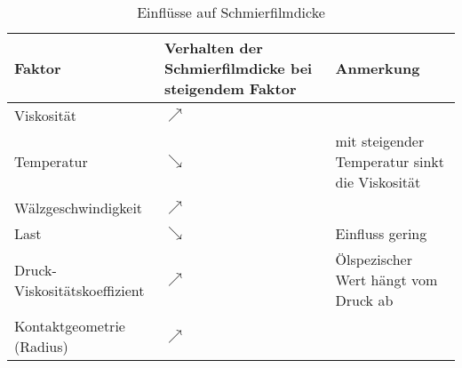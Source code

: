 \begin{table}[htbp]
    \caption{Einflüsse auf Schmierfilmdicke \cite{wisniewski_2000}}
    \begin{tabular}{l>{\centering\arraybackslash}m{5cm}>{\centering\arraybackslash}m{6cm}}
        \textbf{Faktor}              & \textbf{Verhalten der Schmierfilmdicke bei steigendem Faktor} & \textbf{Anmerkung}                             \\ \hline
        Viskosität                   & $\nearrow$                                                    &                                                \\
        Temperatur                   & $\searrow$                                                    & mit steigender Temperatur sinkt die Viskosität \\
        Wälzgeschwindigkeit          & $\nearrow$                                                    &                                                \\
        Last                         & $\searrow$                                                    & Einfluss gering                                \\
        Druck-Viskositätskoeffizient & $\nearrow$                                                    & Ölspezischer Wert hängt vom Druck ab           \\
        Kontaktgeometrie (Radius)    & $\nearrow$                                                    &                                                \\
    \end{tabular}
    \label{tab:faktor_einfluss_schmierfilmdicke}
\end{table}
